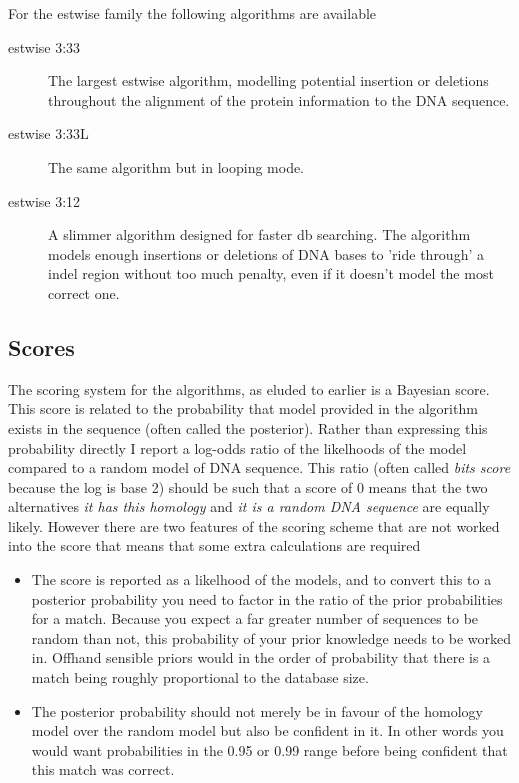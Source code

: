\documentclass{article}
\begin{document}
For the estwise family the following algorithms are available
\begin{description}
\item[estwise 3:33] The largest estwise algorithm, modelling potential
insertion or deletions throughout the alignment of the protein
information to the DNA sequence.
\item[estwise 3:33L] The same algorithm but in looping mode.
\item[estwise 3:12] A slimmer algorithm designed for faster db searching.
The algorithm models enough insertions or deletions of DNA bases to
'ride through' a indel region without too much penalty, even if it
doesn't model the most correct one.
\end{description}

\subsection{Scores}

The scoring system for the algorithms, as eluded to earlier is a
Bayesian score. This score is related to the probability that model
provided in the algorithm exists in the sequence (often called the
posterior). Rather than expressing this probability directly I report
a log-odds ratio of the likelhoods of the model compared to a random
model of DNA sequence. This ratio (often called \emph{bits score}
because the log is base 2) should be such that a score of 0 means that
the two alternatives \emph{it has this homology} and \emph{it is a
random DNA sequence} are equally likely. However there are two
features of the scoring scheme that are not worked into the score that
means that some extra calculations are required

\begin{itemize}
\item The score is reported as a likelhood of the models, and to
convert this to a posterior probability you need to factor in the
ratio of the prior probabilities for a match. Because you expect a far
greater number of sequences to be random than not, this probability of
your prior knowledge needs to be worked in. Offhand sensible priors
would in the order of probability that there is a match being roughly
proportional to the database size.

\item The posterior probability should not merely be in favour of the
homology model over the random model but also be confident in it. In
other words you would want probabilities in the 0.95 or 0.99 range
before being confident that this match was correct.
\end{itemize}
\end{document}
